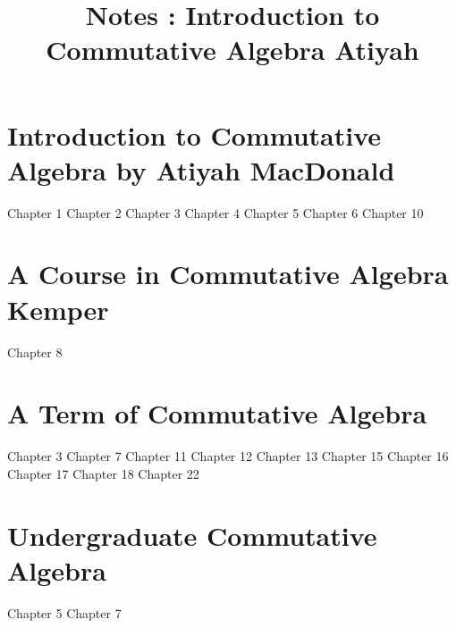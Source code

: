 \documentclass{article}
\title{Notes : Introduction to Commutative Algebra Atiyah}
\begin{document}
\tableofcontents
{}
\newpage\part{Introduction to Commutative Algebra by Atiyah MacDonald}
{Chapter 1}
{Chapter 2}
{Chapter 3}
{Chapter 4}
{Chapter 5}
{Chapter 6}
{Chapter 10}

\newpage\part{A Course in Commutative Algebra Kemper}
{Chapter 8}

\newpage\part{A Term of Commutative Algebra}
{Chapter 3}
{Chapter 7}
{Chapter 11}
{Chapter 12}
{Chapter 13}
{Chapter 15}
{Chapter 16}
{Chapter 17}
{Chapter 18}
{Chapter 22}

\newpage\part{Undergraduate Commutative Algebra}
{Chapter 5}
{Chapter 7}
\end{document}
